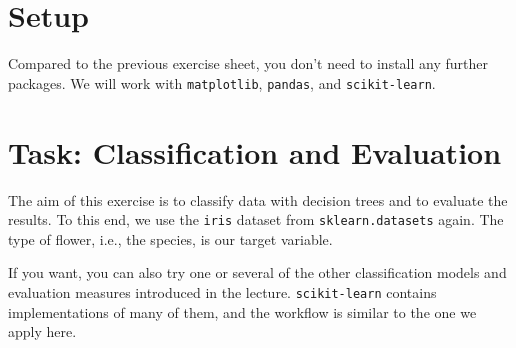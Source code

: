 \documentclass[12pt]{article}
\newcommand{\code}[1]{\textcolor{kitgreen}{\texttt{#1}}}
\begin{document}
\section*{Setup}

Compared to the previous exercise sheet, you don't need to install any further packages.
We will work with \code{matplotlib}, \code{pandas}, and \code{scikit-learn}.

\section*{Task: Classification and Evaluation}

The aim of this exercise is to classify data with decision trees and to evaluate the results.
To this end, we use the \code{iris} dataset from \code{sklearn.datasets} again.
The type of flower, i.e., the species, is our target variable.

If you want, you can also try one or several of the other classification models and evaluation measures introduced in the lecture.
\code{scikit-learn} contains implementations of many of them, and the workflow is similar to the one we apply here.
\end{document}
